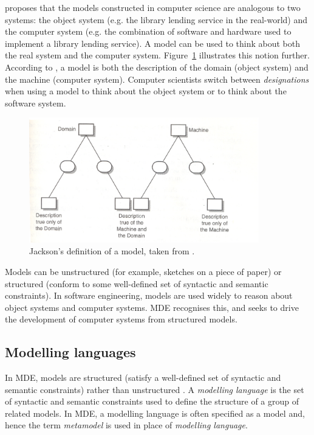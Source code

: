 \cite{jackson95software} proposes that the models constructed in computer science are analogous to two systems: the object system (e.g. the library lending service in the real-world) and the computer system (e.g. the combination of software and hardware used to implement a library lending service). A model can be used to think about both the real system and the computer system. Figure~\ref{fig:jackson_model} illustrates this notion further. According to \cite{jackson95software}, a model is both the description of the domain (object system) and the machine (computer system). Computer scientists switch between \emph{designations} when using a model to think about the object system or to think about the software system.

\begin{figure}[htbp]
  \begin{center}
    \leavevmode
    \includegraphics[width=10cm]{2.Background/images/jackson_model.png}
  \end{center}
  \caption[Jackson's definition of a model]{Jackson's definition of a model, taken from \cite[pg.125]{jackson95software}.}
  \label{fig:jackson_model}
\end{figure}

Models can be unstructured (for example, sketches on a piece of paper) or structured (conform to some well-defined set of syntactic and semantic constraints). In software engineering, models are used widely to reason about object systems and computer systems. MDE recognises this, and seeks to drive the development of computer systems from structured models.

\subsection{Modelling languages}
\label{subsec:modelling_languages}
In MDE, models are structured (satisfy a well-defined set of syntactic and semantic constraints) rather than unstructured \cite{kolovos09thesis}. A \emph{modelling language} is the set of syntactic and semantic constraints used to define the structure of a group of related models. In MDE, a modelling language is often specified as a model and, hence the term \emph{metamodel} is used in place of \emph{modelling language}.

